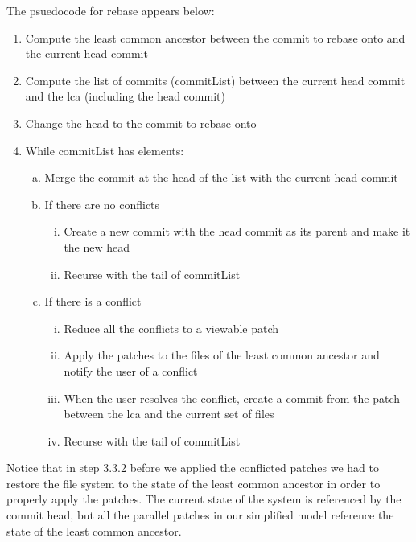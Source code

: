 \documentclass[]{article}
\begin{document}
The psuedocode for rebase appears below:

\begin{enumerate}[1.]
\item
  Compute the least common ancestor between the commit to rebase onto
  and the current head commit
\item
  Compute the list of commits (commitList) between the current head
  commit and the lca (including the head commit)
\item
  Change the head to the commit to rebase onto
\item
  While commitList has elements:

  \begin{enumerate}[a.]
  \item
    Merge the commit at the head of the list with the current head
    commit
  \item
    If there are no conflicts

    \begin{enumerate}[i.]
    \item
      Create a new commit with the head commit as its parent and make it
      the new head
    \item
      Recurse with the tail of commitList
    \end{enumerate}
  \item
    If there is a conflict

    \begin{enumerate}[i.]
    \item
      Reduce all the conflicts to a viewable patch
    \item
      Apply the patches to the files of the least common ancestor and
      notify the user of a conflict
    \item
      When the user resolves the conflict, create a commit from the
      patch between the lca and the current set of files
    \item
      Recurse with the tail of commitList
    \end{enumerate}
  \end{enumerate}
\end{enumerate}

Notice that in step 3.3.2 before we applied the conflicted patches we
had to restore the file system to the state of the least common ancestor
in order to properly apply the patches. The current state of the system
is referenced by the commit head, but all the parallel patches in our
simplified model reference the state of the least common ancestor.
\end{document}
